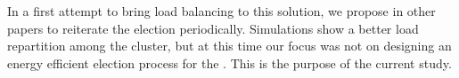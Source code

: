 In a first attempt to bring load balancing to this solution, we propose in other papers\cite{GMT12,BMM13} to reiterate the election periodically.
Simulations show a better load repartition among the cluster, but at this time our focus was not on designing an energy efficient election process for the \cns.
This is the purpose of the current study.
